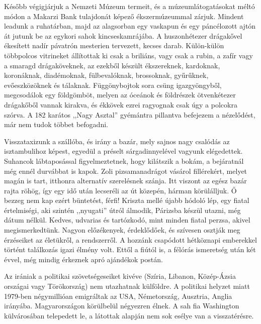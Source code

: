 Később végigjárjuk a Nemzeti Múzeum termeit, és a múzeumlátogatásokat
méltó módon a Makarzi Bank tulajdonát képező ékszermúzeummal
zárjuk. Mindent leadunk a ruhatárban, majd az alagsorban
egy vaskapun és egy páncélozott ajtón át jutunk be az egykori sahok
kincseskamrájába. A huszonhétezer drágakővel ékesített nadír pávatrón
mesterien tervezett, kecses darab. Külön-külön többpolcos vitrineket
állítottak ki csak a briliáns, vagy csak a rubin, a zafír vagy a
smaragd drágaköveknek, az ezekből készült ékszereknek, kardoknak,
koronáknak, diadémoknak, fülbevalóknak, brossoknak, gyűrűknek,
evőeszközöknek és tálaknak. Függönybojtok sora csüng igazgyöngyből,
megcsodálok egy földgömböt, melyen az óceánok és földrészek
ötvenkétezer drágakőből vannak kirakva, és ékkövek ezrei ragyognak
csak úgy a polcokra szórva. A 182 karátos ,,Nagy Asztal'' gyémántra
pillantva befejezem a nézelődést, már nem tudok többet befogadni.

Visszataxizunk a szállóba, és irány a bazár, mely sajnos nagy csalódás
az isztambulihoz képest, egyedül a préselt sárgadinnyelével
vagyunk elégedettek. Suhancok lábtaposással figyelmeztetnek, hogy
kilátszik a bokám, a bejáratnál még ennél durvábbat is kapok. Zoli
pizsamanadrágot vásárol fillérekért, melyet magán is tart, itthonra alternatív
szerelésnek szánja. Itt viszont az egész bazár rajta röhög, így egy
idő után lecseréli az út közepén, hárman körülálljuk. Ő bezzeg nem
kap ezért büntetést, férfi! Kriszta mellé újabb hódoló lép, egy fiatal
értelmiségi, aki szintén ,,nyugati'' útról álmodik, Párizsba készül utazni,
még dátum nélkül. Kedves, udvarias és tartózkodó, mint minden
fiatal perzsa, akivel megismerkedtünk. Nagyon előzékenyek, érdeklődőek,
és szívesen osztják meg érzéseiket az életükről, a rendszerről.
A hozzánk csapódott hétköznapi emberekkel történt találkozás igazi
élmény volt. Ettől a fiútól is, a félórás ismeretség után két évvel, még
mindig érkeznek apró ajándékok postán.

Az irániak a politikai szövetségeseiket kivéve (Szíria, Libanon,
Közép-Ázsia országai vagy Törökország) nem utazhatnak külföldre.
A politikai helyzet miatt 1979-ben négymillióan emigráltak az
USA, Németország, Ausztria, Anglia irányába. Magyarországon körülbelül
négyezren élnek. A sah fia Washington külvárosában telepedett
le, a látottak alapján nem sok esélye van a visszatérésre.

